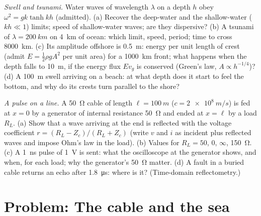 \begin{exercise}[$\star\star\star$]\label{exo:b2:dispersion-wave-packets:11}
\emph{Swell and tsunami.} Water waves of wavelength $\lambda$ on a depth $h$
obey $\omega^2 = gk\tanh kh$ (admitted). (a) Recover the deep-water and the
shallow-water ($kh \ll 1$) limits; speed of shallow-water waves; are
they dispersive? (b) A tsunami of $\lambda = \qty{200}{km}$ on \qty{4}{km} of ocean:
which limit, speed, period; time to cross \qty{8000}{km}. (c) Its
amplitude offshore is \qty{0.5}{m}: energy per unit length of crest
(admit $E = \tfrac12\rho gA^2$ per unit area) for a \qty{1000}{km} front; what
happens when the depth falls to \qty{10}{m}, if the energy flux $Ev_g$ is
conserved (Green's law, $A \propto h^{-1/4}$)? (d) A \qty{100}{m} swell
arriving on a beach: at what depth does it start to feel the bottom,
and why do its crests turn parallel to the shore?
\end{exercise}

\begin{exercise}[$\star\star\star$]\label{exo:b2:dispersion-wave-packets:12}
\emph{A pulse on a line.} A \qty{50}{\ohm} cable of length $\ell = \qty{100}{m}$
($c = \qty{2e8}{m/s}$) is fed at $x = 0$ by a generator of internal
resistance \qty{50}{\ohm} and ended at $x = \ell$ by a load $R_L$. (a) Show
that a wave arriving at the end is reflected with the voltage
coefficient $r = (R_L - Z_c)/(R_L + Z_c)$ (write $v$ and $i$ as incident
plus reflected waves and impose Ohm's law in the load). (b) Values for
$R_L = 50$, $0$, $\infty$, \qty{150}{\ohm}. (c) A \qty{1}{ns} pulse of \qty{1}{V} is
sent: what the oscilloscope at the generator shows, and when, for each
load; why the generator's \qty{50}{\ohm} matter. (d) A fault in a buried
cable returns an echo after \qty{1.8}{\micro s}: where is it? (Time-domain
reflectometry.)
\end{exercise}

\section{Problem: The cable and the sea}

